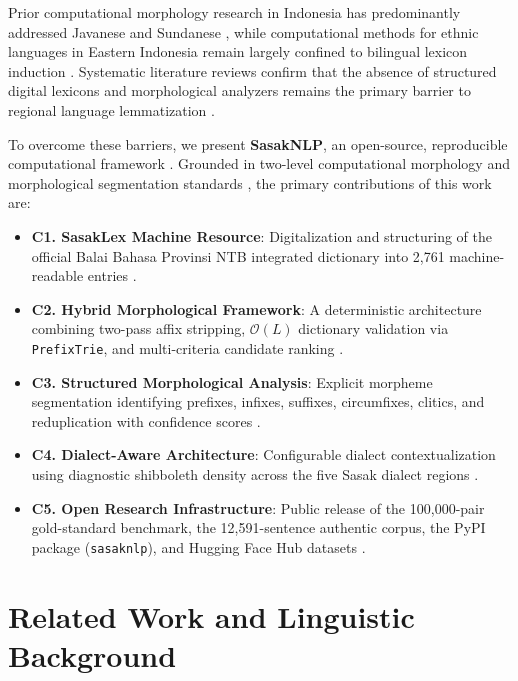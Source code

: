 \documentclass[journal,10pt]{IEEEtran}
\begin{document}
Prior computational morphology research in Indonesia has predominantly addressed Javanese and Sundanese \cite{aji2022, abidin2024, wijono2021}, while computational methods for ethnic languages in Eastern Indonesia remain largely confined to bilingual lexicon induction \cite{resiandi2023}. Systematic literature reviews confirm that the absence of structured digital lexicons and morphological analyzers remains the primary barrier to regional language lemmatization \cite{abidin2024}.

To overcome these barriers, we present \textbf{SasakNLP}, an open-source, reproducible computational framework \cite{sasaknlp2026}. Grounded in two-level computational morphology \cite{jurafsky2024} and morphological segmentation standards \cite{batsuren2022}, the primary contributions of this work are:
\begin{itemize}
    \item \textbf{C1. SasakLex Machine Resource}: Digitalization and structuring of the official Balai Bahasa Provinsi NTB integrated dictionary into 2,761 machine-readable entries \cite{balaibahasa2022, sasaknlp2026}.
    \item \textbf{C2. Hybrid Morphological Framework}: A deterministic architecture combining two-pass affix stripping, $\mathcal{O}(L)$ dictionary validation via \texttt{PrefixTrie}, and multi-criteria candidate ranking \cite{abidin2024, jurafsky2024}.
    \item \textbf{C3. Structured Morphological Analysis}: Explicit morpheme segmentation identifying prefixes, infixes, suffixes, circumfixes, clitics, and reduplication with confidence scores \cite{jurafsky2024, batsuren2022}.
    \item \textbf{C4. Dialect-Aware Architecture}: Configurable dialect contextualization using diagnostic shibboleth density across the five Sasak dialect regions \cite{hakim2023, hakim2022}.
    \item \textbf{C5. Open Research Infrastructure}: Public release of the 100,000-pair gold-standard benchmark, the 12,591-sentence authentic corpus, the PyPI package (\texttt{sasaknlp}), and Hugging Face Hub datasets \cite{sasaknlp2026}.
\end{itemize}

\section{Related Work and Linguistic Background}
\end{document}
